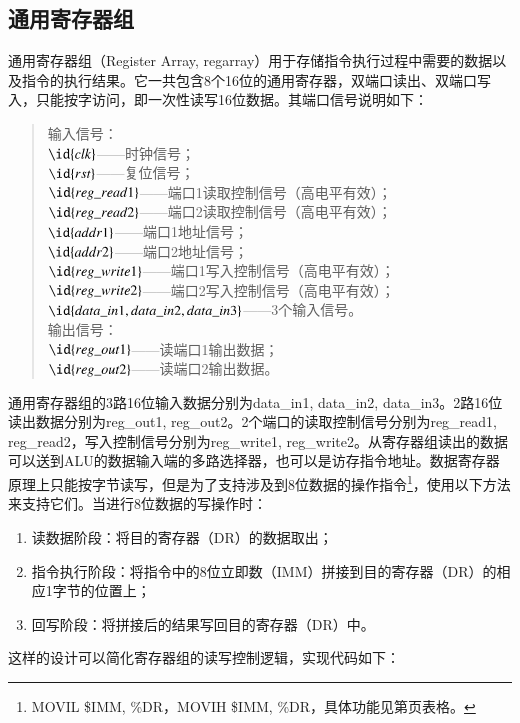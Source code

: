 \documentclass[titlepage, 11pt]{article}
\begin{document}
	\subsection{通用寄存器组}
		通用寄存器组（Register Array, regarray）用于存储指令执行过程中需要的数据以及指令的执行结果。它一共包含8个16位的通用寄存器，双端口读出、双端口写入，只能按字访问，即一次性读写16位数据。其端口信号说明如下：
		\begin{quote}
			输入信号：\\
			$\id{clk}$——时钟信号；\\
			$\id{rst}$——复位信号；\\
			$\id{reg\_read1}$——端口1读取控制信号（高电平有效）；\\
			$\id{reg\_read2}$——端口2读取控制信号（高电平有效）；\\
			$\id{addr1}$——端口1地址信号；\\
			$\id{addr2}$——端口2地址信号；\\
			$\id{reg\_write1}$——端口1写入控制信号（高电平有效）；\\
			$\id{reg\_write2}$——端口2写入控制信号（高电平有效）；\\
			$\id{data\_in1,data\_in2,data\_in3}$——3个输入信号。\\
			输出信号：\\
			$\id{reg\_out1}$——读端口1输出数据；\\
			$\id{reg\_out2}$——读端口2输出数据。	
		\end{quote}\par 
		通用寄存器组的3路16位输入数据分别为data\_in1, data\_in2, data\_in3。2路16位读出数据分别为reg\_out1, reg\_out2。2个端口的读取控制信号分别为reg\_read1, reg\_read2，写入控制信号分别为reg\_write1, reg\_write2。从寄存器组读出的数据可以送到ALU的数据输入端的多路选择器，也可以是访存指令地址。数据寄存器原理上只能按字节读写，但是为了支持涉及到8位数据的操作指令\footnote{MOVIL \$IMM, \%DR，MOVIH \$IMM, \%DR，具体功能见第页表格。}，使用以下方法来支持它们。当进行8位数据的写操作时：
		\begin{enumerate}
			\item 读数据阶段：将目的寄存器（DR）的数据取出；
			\item 指令执行阶段：将指令中的8位立即数（IMM）拼接到目的寄存器（DR）的相应1字节的位置上；
			\item 回写阶段：将拼接后的结果写回目的寄存器（DR）中。
		\end{enumerate}
		\par 这样的设计可以简化寄存器组的读写控制逻辑，实现代码如下：
\end{document}
